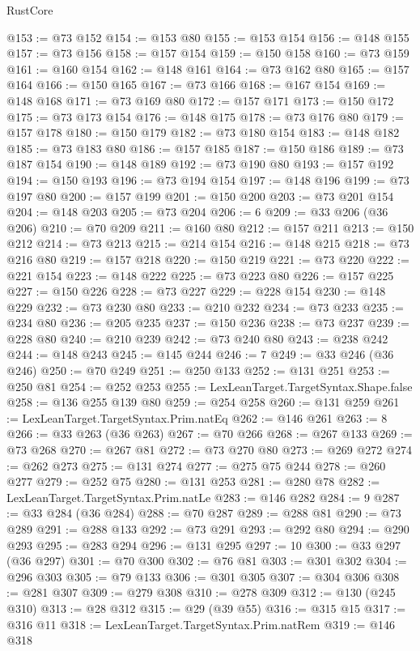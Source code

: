 \begin{lexlean}{RustCore}
\begin{coremodule}
@153 := @73 @152
@154 := @153 @80
@155 := @153 @154
@156 := @148 @155
@157 := @73 @156
@158 := @157 @154
@159 := @150 @158
@160 := @73 @159
@161 := @160 @154
@162 := @148 @161
@164 := @73 @162 @80
@165 := @157 @164
@166 := @150 @165
@167 := @73 @166
@168 := @167 @154
@169 := @148 @168
@171 := @73 @169 @80
@172 := @157 @171
@173 := @150 @172
@175 := @73 @173 @154
@176 := @148 @175
@178 := @73 @176 @80
@179 := @157 @178
@180 := @150 @179
@182 := @73 @180 @154
@183 := @148 @182
@185 := @73 @183 @80
@186 := @157 @185
@187 := @150 @186
@189 := @73 @187 @154
@190 := @148 @189
@192 := @73 @190 @80
@193 := @157 @192
@194 := @150 @193
@196 := @73 @194 @154
@197 := @148 @196
@199 := @73 @197 @80
@200 := @157 @199
@201 := @150 @200
@203 := @73 @201 @154
@204 := @148 @203
@205 := @73 @204
@206 := 6
@209 := @33 @206 (@36 @206)
@210 := @70 @209
@211 := @160 @80
@212 := @157 @211
@213 := @150 @212
@214 := @73 @213
@215 := @214 @154
@216 := @148 @215
@218 := @73 @216 @80
@219 := @157 @218
@220 := @150 @219
@221 := @73 @220
@222 := @221 @154
@223 := @148 @222
@225 := @73 @223 @80
@226 := @157 @225
@227 := @150 @226
@228 := @73 @227
@229 := @228 @154
@230 := @148 @229
@232 := @73 @230 @80
@233 := @210 @232
@234 := @73 @233
@235 := @234 @80
@236 := @205 @235
@237 := @150 @236
@238 := @73 @237
@239 := @228 @80
@240 := @210 @239
@242 := @73 @240 @80
@243 := @238 @242
@244 := @148 @243
@245 := @145 @244
@246 := 7
@249 := @33 @246 (@36 @246)
@250 := @70 @249
@251 := @250 @133
@252 := @131 @251
@253 := @250 @81
@254 := @252 @253
@255 := LexLeanTarget.TargetSyntax.Shape.false
@258 := @136 @255 @139 @80
@259 := @254 @258
@260 := @131 @259
@261 := LexLeanTarget.TargetSyntax.Prim.natEq
@262 := @146 @261
@263 := 8
@266 := @33 @263 (@36 @263)
@267 := @70 @266
@268 := @267 @133
@269 := @73 @268
@270 := @267 @81
@272 := @73 @270 @80
@273 := @269 @272
@274 := @262 @273
@275 := @131 @274
@277 := @275 @75 @244
@278 := @260 @277
@279 := @252 @75
@280 := @131 @253
@281 := @280 @78
@282 := LexLeanTarget.TargetSyntax.Prim.natLe
@283 := @146 @282
@284 := 9
@287 := @33 @284 (@36 @284)
@288 := @70 @287
@289 := @288 @81
@290 := @73 @289
@291 := @288 @133
@292 := @73 @291
@293 := @292 @80
@294 := @290 @293
@295 := @283 @294
@296 := @131 @295
@297 := 10
@300 := @33 @297 (@36 @297)
@301 := @70 @300
@302 := @76 @81
@303 := @301 @302
@304 := @296 @303
@305 := @79 @133
@306 := @301 @305
@307 := @304 @306
@308 := @281 @307
@309 := @279 @308
@310 := @278 @309
@312 := @130 (@245 @310)
@313 := @28 @312
@315 := @29 (@39 @55)
@316 := @315 @15
@317 := @316 @11
@318 := LexLeanTarget.TargetSyntax.Prim.natRem
@319 := @146 @318

\end{coremodule}
\end{lexlean}
